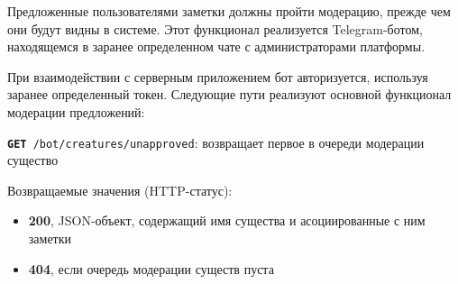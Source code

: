 \documentclass[12pt, a4paper]{article}
\begin{document}
Предложенные пользователями заметки должны пройти модерацию, прежде чем они будут видны в системе.
Этот функционал реализуется Telegram-ботом, находящемся в заранее определенном чате с администраторами платформы.

При взаимодействии с серверным приложением бот авторизуется, используя заранее определенный токен.
Следующие пути реализуют основной функционал модерации предложений:

\texttt{\textbf{GET} /bot/creatures/unapproved}: возвращает первое в очереди модерации существо

Возвращаемые значения (HTTP-статус):
\begin{itemize}[noitemsep,topsep=0pt]
\item \textbf{200}, JSON-объект, содержащий имя существа и асоциированные с ним заметки
\item \textbf{404}, если очередь модерации существ пуста
\end{itemize}
\end{document}
